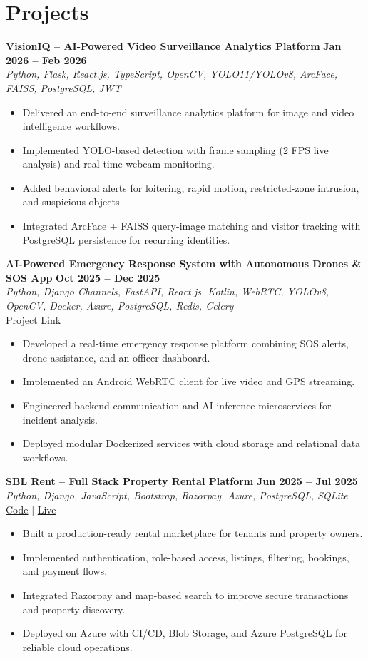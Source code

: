 \documentclass[10pt,a4paper]{article}
\newcommand{\projectHeading}[2]{
  \textbf{#1} \hfill \textbf{#2}\\
}
\begin{document}
\section*{Projects}
\projectHeading{VisionIQ -- AI-Powered Video Surveillance Analytics Platform}{Jan 2026 -- Feb 2026}
\textit{Python, Flask, React.js, TypeScript, OpenCV, YOLO11/YOLOv8, ArcFace, FAISS, PostgreSQL, JWT}
\begin{itemize}
  \item Delivered an end-to-end surveillance analytics platform for image and video intelligence workflows.
  \item Implemented YOLO-based detection with frame sampling (2 FPS live analysis) and real-time webcam monitoring.
  \item Added behavioral alerts for loitering, rapid motion, restricted-zone intrusion, and suspicious objects.
  \item Integrated ArcFace + FAISS query-image matching and visitor tracking with PostgreSQL persistence for recurring identities.
\end{itemize}

\projectHeading{AI-Powered Emergency Response System with Autonomous Drones \& SOS App}{Oct 2025 -- Dec 2025}
\textit{Python, Django Channels, FastAPI, React.js, Kotlin, WebRTC, YOLOv8, OpenCV, Docker, Azure, PostgreSQL, Redis, Celery}\\
\href{https://tinyurl.com/3ae24us4}{Project Link}
\begin{itemize}
  \item Developed a real-time emergency response platform combining SOS alerts, drone assistance, and an officer dashboard.
  \item Implemented an Android WebRTC client for live video and GPS streaming.
  \item Engineered backend communication and AI inference microservices for incident analysis.
  \item Deployed modular Dockerized services with cloud storage and relational data workflows.
\end{itemize}

\projectHeading{SBL Rent -- Full Stack Property Rental Platform}{Jun 2025 -- Jul 2025}
\textit{Python, Django, JavaScript, Bootstrap, Razorpay, Azure, PostgreSQL, SQLite}\\
\href{https://github.com/Nirajlpu/sblRent}{Code} \;|\; \href{https://sblrent-c9ehdmewcqcfhkh7.eastasia-01.azurewebsites.net/}{Live}
\begin{itemize}
  \item Built a production-ready rental marketplace for tenants and property owners.
  \item Implemented authentication, role-based access, listings, filtering, bookings, and payment flows.
  \item Integrated Razorpay and map-based search to improve secure transactions and property discovery.
  \item Deployed on Azure with CI/CD, Blob Storage, and Azure PostgreSQL for reliable cloud operations.
\end{itemize}
\end{document}

